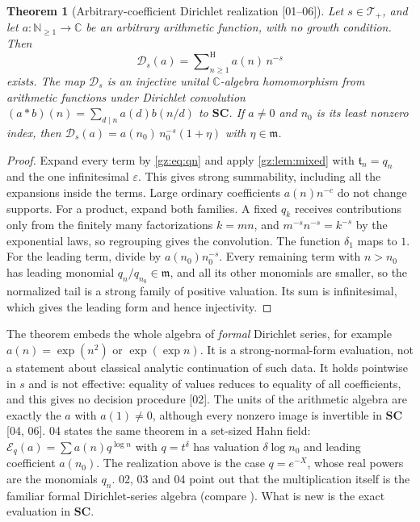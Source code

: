 \documentclass[11pt,a4paper]{article}
\numberwithin{equation}{section}
\newtheorem{theorem}{Theorem}[section]
\theoremstyle{definition}
\theoremstyle{remark}
\newcommand{\SC}{\mathbf{SC}}
\newcommand{\C}{\mathbb C}
\newcommand{\N}{\mathbb N}
\newcommand{\mm}{\mathfrak m}
\newcommand{\eps}{\varepsilon}
\newcommand{\Sh}{\mathop{\textstyle\sum}\nolimits^{\mathrm H}}
\newcommand{\DD}{\mathcal D}
\newcommand{\Tp}{\mathcal T_{+}}
\newcommand{\src}[1]{\textup{[#1]}}
\begin{document}
\begin{theorem}[Arbitrary-coefficient Dirichlet realization \src{01--06}]\label{gz:thm:dirichlet}
Let $s\in\Tp$, and let $a:\N_{\ge1}\to\C$ be an arbitrary arithmetic function,
with no growth condition. Then
\[
\DD_s(a)=\Sh_{n\ge1}a(n)\,n^{-s}
\]
exists. The map $\DD_s$ is an injective unital $\C$-algebra homomorphism
from arithmetic functions under Dirichlet convolution
$(a*b)(n)=\sum_{d\mid n}a(d)b(n/d)$ to $\SC$. If $a\ne0$ and $n_0$ is its
least nonzero index, then $\DD_s(a)=a(n_0)\,n_0^{-s}(1+\eta)$ with $\eta\in\mm$.
\end{theorem}
\begin{proof}
Expand every term by \eqref{gz:eq:qn} and apply \cref{gz:lem:mixed} with
$\mathfrak t_n=q_n$ and the one infinitesimal $\eps$. This gives strong
summability, including all the expansions inside the terms. Large ordinary
coefficients $a(n)n^{-c}$ do not change supports. For a product, expand both
families. A fixed $q_k$ receives contributions only from the finitely many
factorizations $k=mn$, and $m^{-s}n^{-s}=k^{-s}$ by the exponential laws,
so regrouping gives the convolution. The function $\delta_1$ maps to $1$.
For the leading term, divide by $a(n_0)n_0^{-s}$. Every remaining term with
$n>n_0$ has leading monomial $q_n/q_{n_0}\in\mm$, and all its other
monomials are smaller, so the normalized tail is a strong family of
positive valuation. Its sum is infinitesimal, which gives the leading form
and hence injectivity.
\end{proof}
\begin{remark}[Scope \src{02, 04, 06}]\label{gz:rem:dirichlet-scope}
The theorem embeds the whole algebra of \emph{formal} Dirichlet series, for
example $a(n)=\exp(n^2)$ or $\exp(\exp n)$. It is a strong-normal-form
evaluation, not a statement about classical analytic continuation of such
data. It holds pointwise in $s$ and is not effective: equality of values
reduces to equality of all coefficients, and this gives no decision
procedure \src{02}. The units of the arithmetic algebra are exactly the $a$
with $a(1)\ne0$, although every nonzero image is invertible in $\SC$
\src{04, 06}. 04 states the same theorem in a set-sized Hahn field:
$\mathcal E_q(a)=\sum a(n)q^{\log n}$ with $q=t^\delta$ has valuation
$\delta\log n_0$ and leading coefficient $a(n_0)$. The realization above is
the case $q=e^{-X}$, whose real powers are the monomials $q_n$. 02, 03 and
04 point out that the multiplication itself is the familiar formal
Dirichlet-series algebra (compare \cite[\S2]{Pong}). What is new is the
exact evaluation in $\SC$.
\end{remark}
\end{document}
